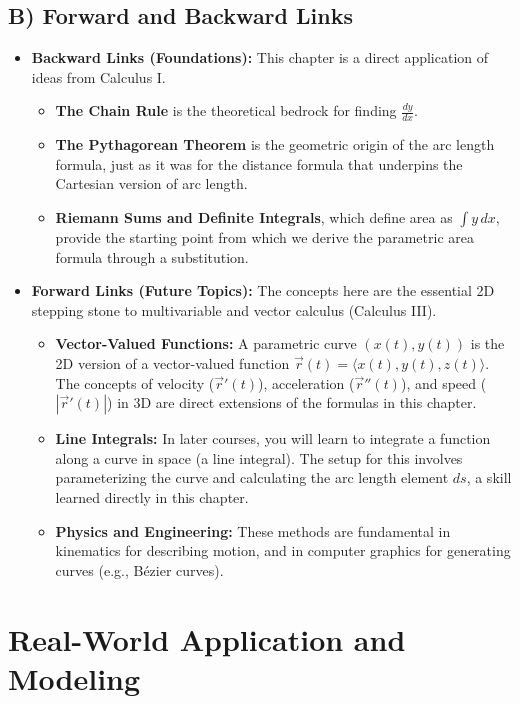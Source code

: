 \documentclass{article}
\begin{document}
\subsection{B) Forward and Backward Links}
\begin{itemize}
    \item \textbf{Backward Links (Foundations):} This chapter is a direct application of ideas from Calculus I.
    \begin{itemize}
        \item \textbf{The Chain Rule} is the theoretical bedrock for finding $\frac{dy}{dx}$.
        \item \textbf{The Pythagorean Theorem} is the geometric origin of the arc length formula, just as it was for the distance formula that underpins the Cartesian version of arc length.
        \item \textbf{Riemann Sums and Definite Integrals}, which define area as $\int y \, dx$, provide the starting point from which we derive the parametric area formula through a substitution.
    \end{itemize}
    \item \textbf{Forward Links (Future Topics):} The concepts here are the essential 2D stepping stone to multivariable and vector calculus (Calculus III).
    \begin{itemize}
        \item \textbf{Vector-Valued Functions:} A parametric curve $(x(t), y(t))$ is the 2D version of a vector-valued function $\vec{r}(t) = \langle x(t), y(t), z(t) \rangle$. The concepts of velocity ($\vec{r}'(t)$), acceleration ($\vec{r}''(t)$), and speed ($|\vec{r}'(t)|$) in 3D are direct extensions of the formulas in this chapter.
        \item \textbf{Line Integrals:} In later courses, you will learn to integrate a function along a curve in space (a line integral). The setup for this involves parameterizing the curve and calculating the arc length element $ds$, a skill learned directly in this chapter.
        \item \textbf{Physics and Engineering:} These methods are fundamental in kinematics for describing motion, and in computer graphics for generating curves (e.g., B\'ezier curves).
    \end{itemize}
\end{itemize}

\newpage
\section{Real-World Application and Modeling}
\end{document}

